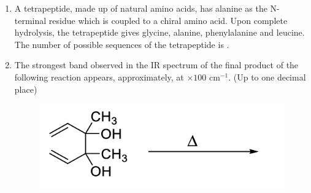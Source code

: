 \documentclass{article}
\begin{document}
\begin{enumerate}
\item A tetrapeptide, made up of natural amino acids, has alanine as the N-terminal residue 
which is coupled to a chiral amino acid. Upon complete hydrolysis, the tetrapeptide gives 
glycine, alanine, phenylalanine and leucine. The number of possible sequences of the 
tetrapeptide is \underline{\hspace{2cm}}.

\item The strongest band observed in the IR spectrum of the final product of the following 
reaction appears, approximately, at \underline{\hspace{2cm}} $\times 100$ cm$^{-1}$. (Up to one decimal place)
\begin{figure}[H]
    \centering
    \includegraphics[width=0.5\columnwidth]{figures/cy_q55.png}
    \label{fig:placeholder}
\end{figure}

\end{enumerate}
\end{document}
